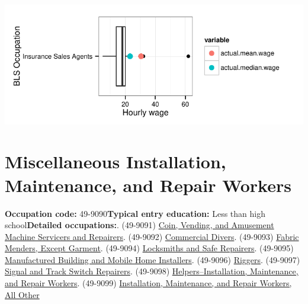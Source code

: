 \documentclass[a4paper,10pt]{article}\usepackage[]{graphicx}\usepackage[]{color}
\makeatletter
\def\maxwidth{ %
  \ifdim\Gin@nat@width>\linewidth
    \linewidth
  \else
    \Gin@nat@width
  \fi
}
\makeatother
\begin{document}
{\centering \includegraphics[width=\maxwidth]{figure/unnamed-chunk-296} 

}


\newpage\section{Miscellaneous Installation, Maintenance, and Repair Workers}\textbf{Occupation code:} 49-9090\newline\textbf{Typical entry education:} Less than high school\newline\textbf{Detailed occupations:}. (49-9091)  \href{http://www.bls.gov/oes/current/oes499091.htm}{Coin, Vending, and Amusement Machine Servicers and Repairers}. (49-9092)  \href{http://www.bls.gov/oes/current/oes499092.htm}{Commercial Divers}. (49-9093)  \href{http://www.bls.gov/oes/current/oes499093.htm}{Fabric Menders, Except Garment}. (49-9094)  \href{http://www.bls.gov/oes/current/oes499094.htm}{Locksmiths and Safe Repairers}. (49-9095)  \href{http://www.bls.gov/oes/current/oes499095.htm}{Manufactured Building and Mobile Home Installers}. (49-9096)  \href{http://www.bls.gov/oes/current/oes499096.htm}{Riggers}. (49-9097)  \href{http://www.bls.gov/oes/current/oes499097.htm}{Signal and Track Switch Repairers}. (49-9098)  \href{http://www.bls.gov/oes/current/oes499098.htm}{Helpers--Installation, Maintenance, and Repair Workers}. (49-9099)  \href{http://www.bls.gov/oes/current/oes499099.htm}{Installation, Maintenance, and Repair Workers, All Other}\newline%
\end{document}
